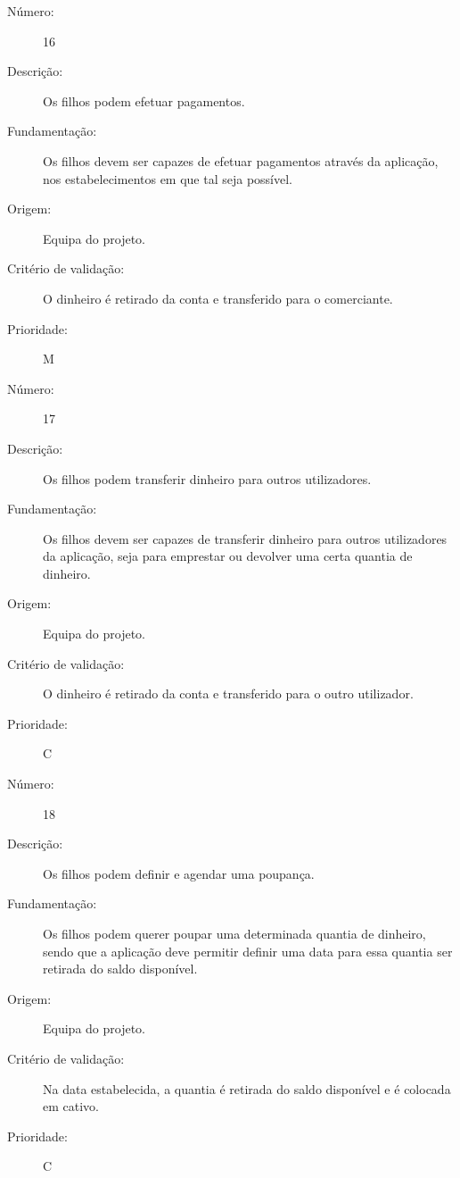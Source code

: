 \documentclass{article}
\begin{document}
            \begin{description}
        \item[Número:]16
        \item[Descrição:]Os filhos podem efetuar pagamentos.
        \item[Fundamentação:]Os filhos devem ser capazes de efetuar pagamentos através da aplicação, nos estabelecimentos em que tal seja possível.
        \item[Origem:]Equipa do projeto.
        \item[Critério de validação:]O dinheiro é retirado da conta e transferido para o comerciante.
        \item[Prioridade:]M
      \end{description}
\vspace{0.5cm}
            \begin{description}
        \item[Número:]17
        \item[Descrição:]Os filhos podem transferir dinheiro para outros utilizadores.
        \item[Fundamentação:]Os filhos devem ser capazes de transferir dinheiro para outros utilizadores da aplicação, seja para emprestar ou devolver uma certa quantia de dinheiro.
        \item[Origem:]Equipa do projeto.
        \item[Critério de validação:]O dinheiro é retirado da conta e transferido para o outro utilizador.
        \item[Prioridade:]C
      \end{description}
\vspace{0.5cm}
            \begin{description}
        \item[Número:]18
        \item[Descrição:]Os filhos podem definir e agendar uma poupança.
        \item[Fundamentação:]Os filhos podem querer poupar uma determinada quantia de dinheiro, sendo que a aplicação deve permitir definir uma data para essa quantia ser retirada do saldo disponível.
        \item[Origem:]Equipa do projeto.
        \item[Critério de validação:]Na data estabelecida, a quantia é retirada do saldo disponível e é colocada em cativo.
        \item[Prioridade:]C
      \end{description}
\end{document}
